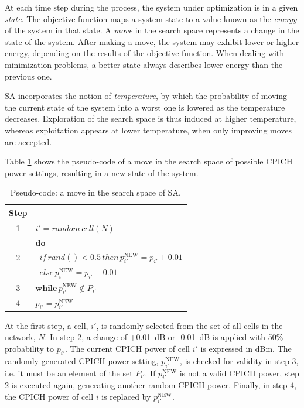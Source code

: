 At each time step during the process, the system under optimization
is in a given \emph{state}. The objective function maps a system state
to a value known as the \emph{energy} of the system in that state.
A \emph{move} in the search space represents a change in the state
of the system. After making a move, the system may exhibit lower or
higher energy, depending on the results of the objective function.
When dealing with minimization problems, a better state always describes
lower energy than the previous one.

SA incorporates the notion of \emph{temperature}, by which the probability
of moving the current state of the system into a worst one is lowered
as the temperature decreases. Exploration of the search space is thus
induced at higher temperature, whereas exploitation appears at lower
temperature, when only improving moves are accepted.

Table \ref{tab:SA_move} shows the pseudo-code of a move in the search
space of possible CPICH power settings, resulting in a new state of
the system.

\begin{table}
\centering

\caption{Pseudo-code: a move in the search space of SA.\textit{\label{tab:SA_move}}}


\begin{tabular}{c|l}
\hline 
Step & \tabularnewline[\doublerulesep]
\hline 
1 & $i'=random\, cell(N)$\tabularnewline
 & $\mathbf{do}$\tabularnewline
2 & $\,\,\, if\, rand()<0.5\, then\, p_{i'}^{\mathrm{NEW}}=p_{i'}+0.01$\tabularnewline
 & $\,\,\, else\, p_{i'}^{\mathrm{NEW}}=p_{i'}-0.01$\tabularnewline
3 & $\mathbf{while}\, p_{i'}^{\mathrm{NEW}}\notin P_{i'}$\tabularnewline
4 & $p_{i'}=p_{i'}^{\mathrm{NEW}}$\tabularnewline
\end{tabular}
\end{table}


At the first step, a cell, $i'$, is randomly selected from the set
of all cells in the network, $N$. In step 2, a change of +0.01~dB
or -0.01~dB is applied with 50\% probability to $p_{i'}$. The current
CPICH power of cell $i'$ is expressed in dBm. The randomly generated
CPICH power setting, $p_{i'}^{\mathrm{NEW}}$, is checked for validity
in step 3, i.e. it must be an element of the set $P_{i'}$. If $p_{i'}^{\mathrm{NEW}}$
is not a valid CPICH power, step 2 is executed again, generating another
random CPICH power. Finally, in step 4, the CPICH power of cell $i$
is replaced by $p_{i'}^{\mathrm{NEW}}$.

